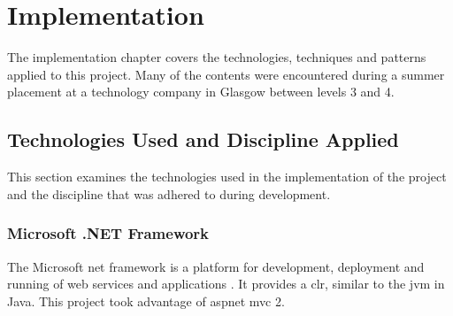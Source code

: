 \chapter{Implementation}
\label{impl}
The implementation chapter covers the technologies, techniques and patterns applied to this project.  Many of the contents were encountered during a summer placement at a technology company in Glasgow between levels 3 and 4.  

\section{Technologies Used and Discipline Applied}
This section examines the technologies used in the implementation of the project and the discipline that was adhered to during development.

\subsection{Microsoft .NET Framework}
The Microsoft \gls{net} framework is a platform for development, deployment and running of web services and applications \cite{whatIsDotNet}.  It provides a \gls{clr}, similar to the \gls{jvm} in Java.  This project took advantage of \gls{asp}\gls{net} \gls{mvc} 2.  


